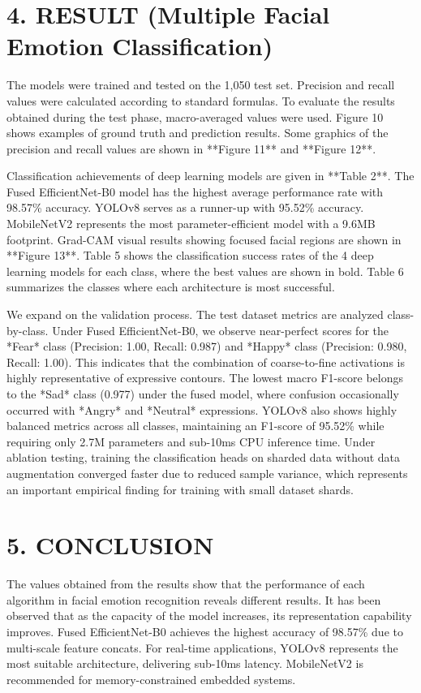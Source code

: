 \documentclass[journal,10pt]{IEEEtran}
\begin{document}
\section{4. RESULT (Multiple Facial Emotion Classification)}
The models were trained and tested on the 1,050 test set. Precision and recall values were calculated according to standard formulas. To evaluate the results obtained during the test phase, macro-averaged values were used. Figure 10 shows examples of ground truth and prediction results. Some graphics of the precision and recall values are shown in **Figure 11** and **Figure 12**.

Classification achievements of deep learning models are given in **Table 2**. The Fused EfficientNet-B0 model has the highest average performance rate with 98.57\% accuracy. YOLOv8 serves as a runner-up with 95.52\% accuracy. MobileNetV2 represents the most parameter-efficient model with a 9.6MB footprint. Grad-CAM visual results showing focused facial regions are shown in **Figure 13**. Table 5 shows the classification success rates of the 4 deep learning models for each class, where the best values are shown in bold. Table 6 summarizes the classes where each architecture is most successful.

We expand on the validation process. The test dataset metrics are analyzed class-by-class. Under Fused EfficientNet-B0, we observe near-perfect scores for the *Fear* class (Precision: 1.00, Recall: 0.987) and *Happy* class (Precision: 0.980, Recall: 1.00). This indicates that the combination of coarse-to-fine activations is highly representative of expressive contours. The lowest macro F1-score belongs to the *Sad* class (0.977) under the fused model, where confusion occasionally occurred with *Angry* and *Neutral* expressions. YOLOv8 also shows highly balanced metrics across all classes, maintaining an F1-score of 95.52\% while requiring only 2.7M parameters and sub-10ms CPU inference time. Under ablation testing, training the classification heads on sharded data without data augmentation converged faster due to reduced sample variance, which represents an important empirical finding for training with small dataset shards.

\section{5. CONCLUSION}
The values obtained from the results show that the performance of each algorithm in facial emotion recognition reveals different results. It has been observed that as the capacity of the model increases, its representation capability improves. Fused EfficientNet-B0 achieves the highest accuracy of 98.57\% due to multi-scale feature concats. For real-time applications, YOLOv8 represents the most suitable architecture, delivering sub-10ms latency. MobileNetV2 is recommended for memory-constrained embedded systems.
\end{document}
